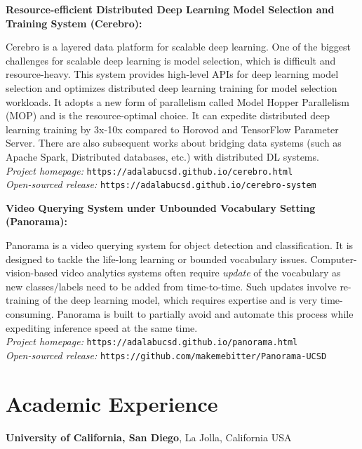 \documentclass[margin,line]{res}
\begin{document}
\begin{resume}
{\bf Resource-efficient Distributed Deep Learning Model Selection and Training System (Cerebro):}

Cerebro is a layered data platform for scalable deep learning. One of the biggest challenges for scalable deep learning is model selection, which is difficult and resource-heavy. This system provides high-level APIs for deep learning model selection and optimizes distributed deep learning training for model selection workloads. It adopts a new form of parallelism called Model Hopper Parallelism (MOP) and is the resource-optimal choice. It can expedite distributed deep learning training by 3x-10x compared to Horovod and TensorFlow Parameter Server. There are also subsequent works about bridging data systems (such as Apache Spark, Distributed databases, etc.) with distributed DL systems.\\
\textit{Project homepage: }\texttt{https://adalabucsd.github.io/cerebro.html}\\
\textit{Open-sourced release: }\texttt{https://adalabucsd.github.io/cerebro-system}

{\bf Video Querying System under Unbounded Vocabulary Setting (Panorama):}

Panorama is a video querying system for object detection and classification. It is designed to tackle the life-long learning or bounded vocabulary issues. Computer-vision-based video analytics systems often require \textit{update} of the vocabulary as new classes/labels need to be added from time-to-time. Such updates involve re-training of the deep learning model, which requires expertise and is very time-consuming. Panorama is built to partially avoid and automate this process while expediting inference speed at the same time.\\
\textit{Project homepage: }\texttt{https://adalabucsd.github.io/panorama.html}\\
\textit{Open-sourced release: }\texttt{https://github.com/makemebitter/Panorama-UCSD}


\section{\sc Academic Experience}
{\bf University of California, San Diego}, La Jolla, California USA


\end{resume}
\end{document}
